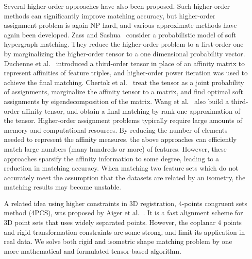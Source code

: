 Several higher-order approaches have also been proposed.
Such higher-order methods can significantly improve matching accuracy,
but higher-order assignment problem is again NP-hard, and various approximate methods have again been developed.
Zass and Sashua~\cite{Zass08} consider a probabilistic model of soft hypergraph matching.
They reduce the higher-order problem to a first-order one by marginalizing the higher-order tensor to a one dimensional probability vector.
Duchenne et al.~\cite{Duchenne_etal09} introduced a third-order tensor in place of an affinity matrix to represent affinities of feature triples,
and higher-order power iteration was used to achieve the final matching.
Chertok et al.~\cite{Chertok10} treat the tensor as a joint probability of assignments, marginalize the affinity tensor to a matrix,
and find optimal soft assignments by eigendecomposition of the matrix.
Wang et al.~\cite{Aiping10} also build a third-order affinity tensor, and obtain a final matching by rank-one approximation of the tensor.
Higher-order assignment problems typically require large amounts of memory and computational resources.
By reducing the number of elements needed to represent the affinity measures,
the above approaches can efficiently match large numbers (many hundreds or more) of features.
However, these approaches sparsify the affinity information to some degree, leading to a reduction in matching accuracy.
When matching two feature sets which do not accurately meet the assumption that the datasets are related by an isometry, the matching results may become unstable.

A related idea using higher constraints in 3D registration, 4-points congruent sets method (4PCS), was proposed by Aiger et al.~\cite{Aiger08}.
It is a fast alignment scheme for 3D point sets that uses widely separated points.
However, the coplanar 4 points and rigid-transformation constraints are some strong, and limit its application in real data.
We solve both rigid and isometric shape matching problem by one more mathematical and formulated tensor-based algorithm.
